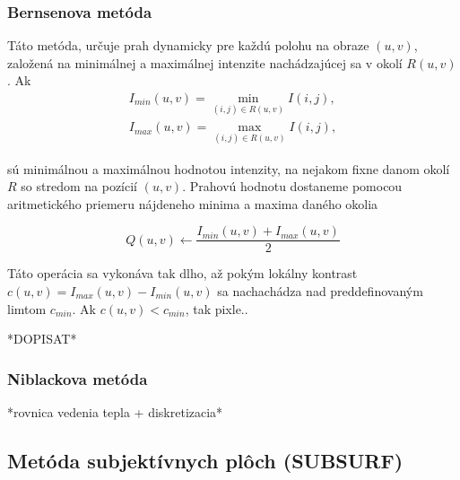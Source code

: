 \documentclass[a4paper,11pt,twoside]{article}%
\begin{document}
\subsubsection{Bernsenova metóda}

Táto metóda, určuje prah dynamicky pre každú polohu na obraze $(u,v)$, založená na minimálnej a maximálnej intenzite nachádzajúcej sa v okolí $R(u,v)$. Ak 
\begin{equation}
\begin{array}{l}
I_{min}(u,v) = \min\limits_{(i,j)\in R(u,v)} I(i,j),  \\
I_{max}(u,v) = \max\limits_{(i,j)\in R(u,v)} I(i,j),
\end{array}
\end{equation}

sú minimálnou a maximálnou hodnotou intenzity, na nejakom fixne danom okolí $R$ so stredom na pozícií $(u,v)$. Prahovú hodnotu dostaneme pomocou aritmetického priemeru nájdeneho minima a maxima daného okolia 

\begin{equation}
Q(u,v) \gets \frac{I_{min}(u,v) + I_{max}(u,v)}{2}
\end{equation}

Táto operácia sa vykonáva tak dlho, až pokým lokálny kontrast $c(u, v) = I_{max}(u, v) − I_{min}(u, v)$ sa nachachádza nad preddefinovaným limtom $c_{min}$. Ak $c(u, v) < c_{min}$, tak pixle..

*DOPISAT*

\subsubsection{Niblackova metóda}
*rovnica vedenia tepla + diskretizacia*
\subsection{Metóda subjektívnych plôch (SUBSURF)}
\end{document}
